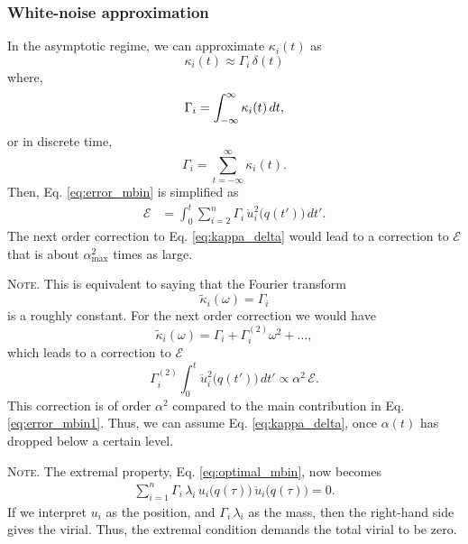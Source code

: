 \documentclass[reprint]{revtex4-1}
\newcommand{\note}[1]{{\color{DarkGreen}\footnotesize \textsc{Note.} #1}}
\begin{document}
\subsubsection{White-noise approximation}



In the asymptotic regime,
we can approximate $\kappa_i(t)$ as
%
\begin{equation}
  \kappa_i(t) \approx \Gamma_i \, \delta(t)
  \label{eq:kappa_delta}
\end{equation}
%
where,
\begin{equation}
  \Gamma_i = \int_{-\infty}^\infty \kappa_i(t) \, dt,
  \notag
\end{equation}
or in discrete time,
\begin{equation}
  \Gamma_i = \sum_{t = -\infty}^\infty \kappa_i(t).
  \label{eq:Gamma_sum}
\end{equation}
%
Then, Eq. \eqref{eq:error_mbin} is simplified as
%
\begin{align}
  \mathcal E
  &=
  \int_0^t
  \sum_{i = 2}^n
  \Gamma_i \, \dot u_i^2\bigl( q(t') \bigr) \, dt'.
  \label{eq:error_mbin1}
\end{align}
%
The next order correction to Eq. \eqref{eq:kappa_delta}
would lead to a correction to $\mathcal E$
that is about $\alpha_{\max}^2$ times as large.


\note{This is equivalent to saying that the Fourier transform
  $$
  \tilde \kappa_i(\omega) = \Gamma_i
  $$
  is a roughly constant.
  For the next order correction we would have
  $$
  \tilde \kappa_i(\omega) = \Gamma_i + \Gamma^{(2)}_i \omega^2 + \dots,
  $$
  which leads to a correction to $\mathcal E$
  $$
  \Gamma^{(2)}_i
  \int_0^t \ddot u_i^2\bigl( q(t') \bigr) \, dt'
  \propto
  \alpha^2 \, \mathcal E.
  $$
  This correction is of order $\alpha^2$
  compared to the main contribution in Eq. \eqref{eq:error_mbin1}.
  Thus, we can assume Eq. \eqref{eq:kappa_delta},
  once $\alpha(t)$ has dropped below a certain level.
}

\note{
  The extremal property, Eq. \eqref{eq:optimal_mbin},
  now becomes
  \begin{align}
    \sum_{i=1}^n
      \Gamma_i \, \lambda_i \,
      u_i\bigl( q(\tau) \bigr) \,
      \ddot u_i\bigl( q(\tau) \bigr) = 0.
    \label{eq:optimal_mbin1}
  \end{align}
  If we interpret $u_i$ as the position,
  and $\Gamma_i \, \lambda_i$ as the mass,
  then the right-hand side gives the virial.
  Thus, the extremal condition demands
  the total virial to be zero.
  $$\,$$
}
\end{document}
